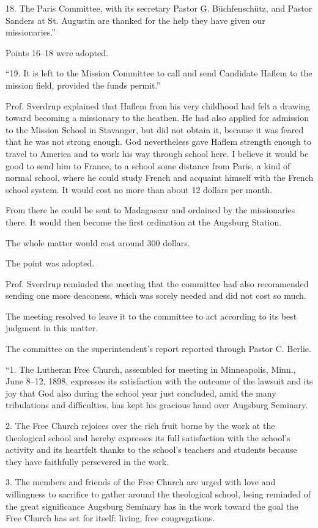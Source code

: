 18. The Paris Committee, with its secretary Pastor G. Büchfenschütz, and Pastor Sanders at St. Augustin are thanked for the help they have given our missionaries.”

Points 16–18 were adopted.

“19. It is left to the Mission Committee to call and send Candidate Haflem to the mission field, provided the funds permit.”

Prof. Sverdrup explained that Haflem from his very childhood had felt a drawing toward becoming a missionary to the heathen. He had also applied for admission to the Mission School in Stavanger, but did not obtain it, because it was feared that he was not strong enough. God nevertheless gave Haflem strength enough to travel to America and to work his way through school here. I believe it would be good to send him to France, to a school some distance from Paris, a kind of normal school, where he could study French and acquaint himself with the French school system. It would cost no more than about 12 dollars per month.

From there he could be sent to Madagascar and ordained by the missionaries there. It would then become the first ordination at the Augsburg Station.

The whole matter would cost around 300 dollars.

The point was adopted.

Prof. Sverdrup reminded the meeting that the committee had also recommended sending one more deaconess, which was sorely needed and did not cost so much.

The meeting resolved to leave it to the committee to act according to its best judgment in this matter.

The committee on the superintendent’s report reported through Pastor C. Berlie.

“1. The Lutheran Free Church, assembled for meeting in Minneapolis, Minn., June 8–12, 1898, expresses its satisfaction with the outcome of the lawsuit and its joy that God also during the school year just concluded, amid the many tribulations and difficulties, has kept his gracious hand over Augsburg Seminary.

2. The Free Church rejoices over the rich fruit borne by the work at the theological school and hereby expresses its full satisfaction with the school’s activity and its heartfelt thanks to the school’s teachers and students because they have faithfully persevered in the work.

3. The members and friends of the Free Church are urged with love and willingness to sacrifice to gather around the theological school, being reminded of the great significance Augsburg Seminary has in the work toward the goal the Free Church has set for itself: living, free congregations.

